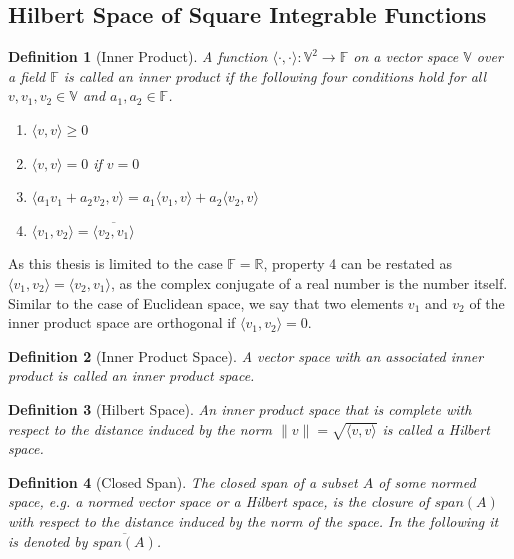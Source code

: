 \documentclass[12pt, a4paper]{article}
\theoremstyle{MAstyle} \newtheorem{assumption}{Assumption}[section]
\theoremstyle{MAstyle} \newtheorem{definition}{Definition}[section]
\begin{document}
		\subsection{Hilbert Space of Square Integrable Functions}\label{Square_Integrable_Functions}
			\begin{definition}[Inner Product]
				A function $\langle \cdot , \cdot \rangle : \mathbb{V}^2 \rightarrow \mathbb{F}$ on a vector space $\mathbb{V}$ over a field $\mathbb{F}$ is called an inner product if the following four conditions hold for all $v, v_1, v_2 \in \mathbb{V}$ and $a_1, a_2 \in \mathbb{F}$.
				\begin{multicols}{2}
					\begin{enumerate}
						\item $\langle v,v \rangle \geq 0$
						\item $\langle v,v \rangle = 0$ if $v = 0$
						\item $\langle a_1 v_1 + a_2 v_2, v \rangle = a_1 \langle v_1, v \rangle + a_2 \langle v_2, v \rangle$
						\item $\langle v_1, v_2 \rangle = \overline{\langle v_2, v_1 \rangle}$
					\end{enumerate}
				\end{multicols}
			\end{definition}
			As this thesis is limited to the case $\mathbb{F} = \mathbb{R}$, property 4 can be restated as $\langle v_1, v_2 \rangle = \langle v_2, v_1 \rangle$, as the complex conjugate of a real number is the number itself. Similar to the case of Euclidean space, we say that two elements $v_1$ and $v_2$ of the inner product space are orthogonal if $\langle v_1, v_2 \rangle = 0$.
			
			\begin{definition}[Inner Product Space]
				A vector space with an associated inner product is called an inner product space.
			\end{definition}

			\begin{definition}[Hilbert Space]
				An inner product space that is complete with respect to the distance induced by the norm $\| v \| = \sqrt{\langle v, v\rangle}$ is called a Hilbert space.
			\end{definition}
		
			\begin{definition}[Closed Span]
				The closed span of a subset $A$ of some normed space, e.g. a normed vector space or a Hilbert space, is the closure of $\textit{span}\left(A\right)$ with respect to the distance induced by the norm of the space. In the following it is denoted by $\overline{{\textit{span}\left(A\right)}}$.
			\end{definition}
		
\end{document}
